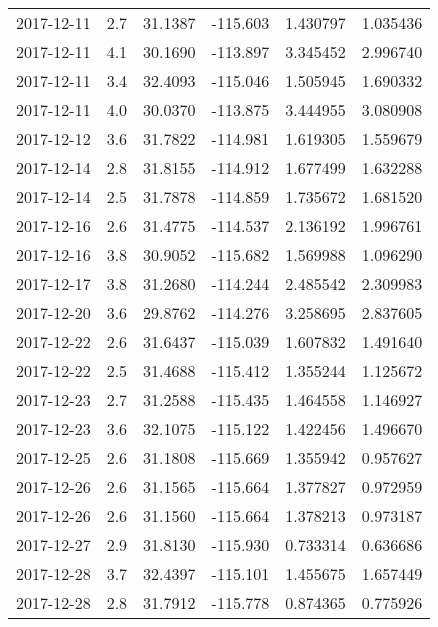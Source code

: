 \begin{tabular}{lrrrrr}
2017-12-11 &       2.7 &  31.1387 &  -115.603 &         1.430797 &         1.035436 \\
2017-12-11 &       4.1 &  30.1690 &  -113.897 &         3.345452 &         2.996740 \\
2017-12-11 &       3.4 &  32.4093 &  -115.046 &         1.505945 &         1.690332 \\
2017-12-11 &       4.0 &  30.0370 &  -113.875 &         3.444955 &         3.080908 \\
2017-12-12 &       3.6 &  31.7822 &  -114.981 &         1.619305 &         1.559679 \\
2017-12-14 &       2.8 &  31.8155 &  -114.912 &         1.677499 &         1.632288 \\
2017-12-14 &       2.5 &  31.7878 &  -114.859 &         1.735672 &         1.681520 \\
2017-12-16 &       2.6 &  31.4775 &  -114.537 &         2.136192 &         1.996761 \\
2017-12-16 &       3.8 &  30.9052 &  -115.682 &         1.569988 &         1.096290 \\
2017-12-17 &       3.8 &  31.2680 &  -114.244 &         2.485542 &         2.309983 \\
2017-12-20 &       3.6 &  29.8762 &  -114.276 &         3.258695 &         2.837605 \\
2017-12-22 &       2.6 &  31.6437 &  -115.039 &         1.607832 &         1.491640 \\
2017-12-22 &       2.5 &  31.4688 &  -115.412 &         1.355244 &         1.125672 \\
2017-12-23 &       2.7 &  31.2588 &  -115.435 &         1.464558 &         1.146927 \\
2017-12-23 &       3.6 &  32.1075 &  -115.122 &         1.422456 &         1.496670 \\
2017-12-25 &       2.6 &  31.1808 &  -115.669 &         1.355942 &         0.957627 \\
2017-12-26 &       2.6 &  31.1565 &  -115.664 &         1.377827 &         0.972959 \\
2017-12-26 &       2.6 &  31.1560 &  -115.664 &         1.378213 &         0.973187 \\
2017-12-27 &       2.9 &  31.8130 &  -115.930 &         0.733314 &         0.636686 \\
2017-12-28 &       3.7 &  32.4397 &  -115.101 &         1.455675 &         1.657449 \\
2017-12-28 &       2.8 &  31.7912 &  -115.778 &         0.874365 &         0.775926 \\

\end{tabular}
